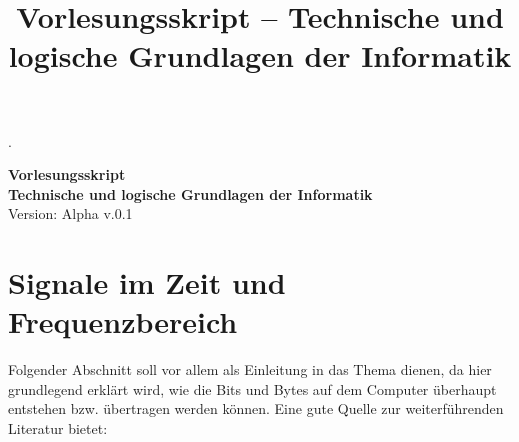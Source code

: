 \documentclass[numbers=endperiod]{scrartcl}
\def\namecorollary{Korollar}
\def\namedefinition{Definition}
\def\nameexercise{Aufgabe}
\def\namelemma{Lemma}
\def\nameproposition{Aussage}
\def\nameremark{Anmerkung}
\def\nametheorem{Satz}
\def\namecorollary{Corollary}
\def\namedefinition{Definition}
\def\nameexercise{Exercise}
\def\namelemma{Lemma}
\def\nameproposition{Proposition}
\def\nameremark{Remark}
\def\nametheorem{Theorem}
\begin{document}
\author{}
\title{Vorlesungsskript -- Technische und logische Grundlagen der Informatik}

\theoremstyle{definition}
\newtheorem{definition}{\namedefinition}

\theoremstyle{remark}
\newtheorem{remark}{\nameremark}

\theoremstyle{plain}
\newtheorem{proposition}{\nameproposition}
\newtheorem{theorem}{\nametheorem}
\newtheorem{lemma}{\namelemma}
\newtheorem{corollary}{\namecorollary}

  {}         %
  {}         %
  {\upshape} %
  {}         %
  {\bfseries}%
  {}         %
  { }        %
  {%
.%
}
\theoremstyle{exercise}
\newtheorem{exercise}{\nameexercise}[section]


\begin{center}
\Huge{\textbf{Vorlesungsskript}}\\
\Large{\textbf{Technische und logische Grundlagen der Informatik}}\\
\large{Version: Alpha v.0.1}
\end{center}

\tableofcontents

\section{Signale im Zeit und Frequenzbereich}
Folgender Abschnitt soll vor allem als Einleitung in das Thema dienen, da hier grundlegend erklärt wird, wie die Bits und Bytes auf dem Computer überhaupt entstehen bzw. übertragen werden können. Eine gute Quelle zur weiterführenden Literatur bietet: \cite{kemnitz2009technische1}
\end{document}
